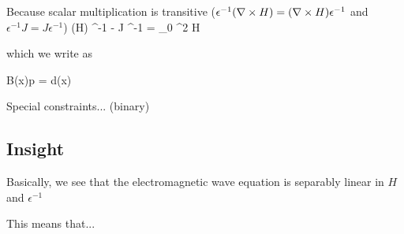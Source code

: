 Because scalar multiplication is transitive 
    ($\epsilon^{-1} (\nabla\times H) = (\nabla\times H) \epsilon^{-1}$ and
    $\epsilon^{-1} J = J \epsilon^{-1}$)
\BE \curl (\curl H) \epsilon^{-1} - \curl J \epsilon^{-1}  = \mu_0 \omega^2 H  \EE

which we write as 

\BE B(x)p = d(x) \EE 

Special constraints... (binary)

\subsection{Insight}
Basically, we see that the electromagnetic wave equation is separably linear in $H$ and $\epsilon^{-1}$

This means that...


